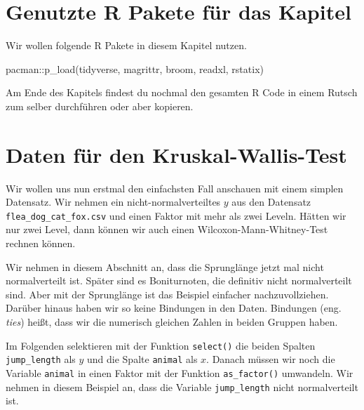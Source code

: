 \documentclass[
  letterpaper,
]{scrbook}
\newenvironment{Shaded}{\begin{snugshade}}{\end{snugshade}}
\newcommand{\FunctionTok}[1]{\textcolor[rgb]{0.28,0.35,0.67}{#1}}
\newcommand{\NormalTok}[1]{\textcolor[rgb]{0.00,0.23,0.31}{#1}}
\newcommand{\SpecialCharTok}[1]{\textcolor[rgb]{0.37,0.37,0.37}{#1}}
\begin{document}
\hypertarget{genutzte-r-pakete-fuxfcr-das-kapitel-10}{%
\section{Genutzte R Pakete für das
Kapitel}\label{genutzte-r-pakete-fuxfcr-das-kapitel-10}}

Wir wollen folgende R Pakete in diesem Kapitel nutzen.

\begin{Shaded}
\begin{Highlighting}[]
\NormalTok{pacman}\SpecialCharTok{::}\FunctionTok{p\_load}\NormalTok{(tidyverse, magrittr, broom, }
\NormalTok{               readxl, rstatix)}
\end{Highlighting}
\end{Shaded}

Am Ende des Kapitels findest du nochmal den gesamten R Code in einem
Rutsch zum selber durchführen oder aber kopieren.

\hypertarget{daten-fuxfcr-den-kruskal-wallis-test}{%
\section{Daten für den
Kruskal-Wallis-Test}\label{daten-fuxfcr-den-kruskal-wallis-test}}

{}

Wir wollen uns nun erstmal den einfachsten Fall anschauen mit einem
simplen Datensatz. Wir nehmen ein nicht-normalverteiltes \(y\) aus den
Datensatz \texttt{flea\_dog\_cat\_fox.csv} und einen Faktor mit mehr als
zwei Leveln. Hätten wir nur zwei Level, dann können wir auch einen
Wilcoxon-Mann-Whitney-Test rechnen können.

Wir nehmen in diesem Abschnitt an, dass die Sprunglänge jetzt mal nicht
normalverteilt ist. Später sind es Boniturnoten, die definitiv nicht
normalverteilt sind. Aber mit der Sprunglänge ist das Beispiel einfacher
nachzuvollziehen. Darüber hinaus haben wir so keine Bindungen in den
Daten. Bindungen (eng. \emph{ties}) heißt, dass wir die numerisch
gleichen Zahlen in beiden Gruppen haben.

Im Folgenden selektieren mit der Funktion \texttt{select()} die beiden
Spalten \texttt{jump\_length} als \(y\) und die Spalte \texttt{animal}
als \(x\). Danach müssen wir noch die Variable \texttt{animal} in einen
Faktor mit der Funktion \texttt{as\_factor()} umwandeln. Wir nehmen in
diesem Beispiel an, dass die Variable \texttt{jump\_length} nicht
normalverteilt ist.
\end{document}
